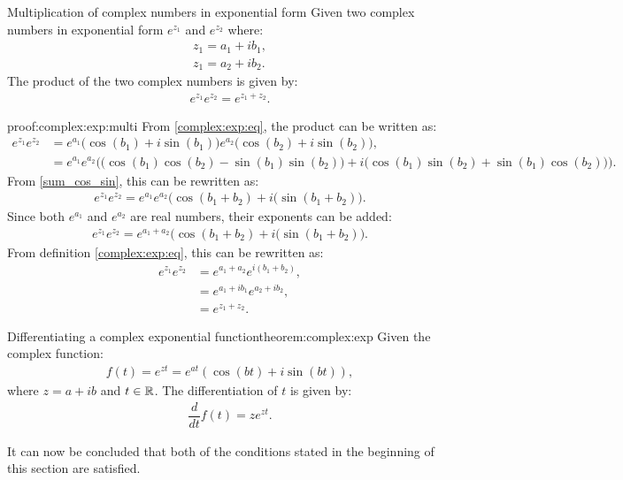 \begin{theorem}{Multiplication of complex numbers in exponential form}{}
Given two complex numbers in exponential form $e^{z_1}$ and $e^{z_2}$ where:
\begin{align*}
z_1=a_1+ib_1,
\\
z_1=a_2+ib_2.
\end{align*}
The product of the two complex numbers is given by:
\begin{align*}
e^{z_1}e^{z_2}=e^{z_1+z_2}.
\end{align*}
\end{theorem}


\begin{prof}{}{proof:complex:exp:multi}
From \cref{complex:exp:eq}, the product can be written as:
\begin{align*}
e^{z_1}e^{z_2}&=e^{a_1}\big(\cos(b_1)+i\sin(b_1)\big)e^{a_2}\big(\cos(b_2)+i\sin(b_2)\big),
\\
&=e^{a_1}e^{a_2} \Big( \big(\cos(b_1)\cos(b_2)-\sin(b_1) \sin(b_2) \big)+i \big(\cos(b_1)\sin(b_2)+\sin(b_1)\cos(b_2) \big) \Big).
\end{align*}
From \eqref{sum_cos_sin}, this can be rewritten as:
\begin{align*}
e^{z_1}e^{z_2}=e^{a_1}e^{a_2}\big(\cos(b_1+b_2)+i(\sin(b_1+b_2)\big).
\end{align*}
Since both $e^{a_1}$ and $e^{a_2}$ are real numbers, their exponents can be added:
\begin{align*}
e^{z_1}e^{z_2}=e^{a_1+a_2}\big(\cos(b_1+b_2)+i(\sin(b_1+b_2)\big).
\end{align*}
From definition \cref{complex:exp:eq},
this can be rewritten as:
\begin{align*}
e^{z_1}e^{z_2}&=e^{a_1+a_2}e^{i(b_1+b_2)},
\\
&=e^{a_1+ib_1}e^{a_2+ib_2},
\\
&=e^{z_1+z_2}.
\end{align*} 
\end{prof}

\begin{theorem}{Differentiating a complex exponential function}{theorem:complex:exp}
Given the complex function:
\begin{align*}
f(t)=e^{zt}=e^{at}(\cos(bt)+i\sin(bt)),
\end{align*}
where $z=a+ib$ and $t\in \mathbb{R}$. The differentiation of $t$ is given by:
\begin{align*}
\dfrac{d}{dt}f(t)=ze^{zt}.
\end{align*}
\end{theorem}



\noindent
It can now be concluded that both of the conditions stated in the beginning of this section are satisfied. 